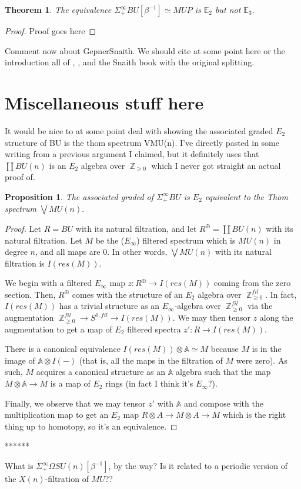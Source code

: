 \documentclass[reqno, oneside]{amsart}
\theoremstyle{definition}
\theoremstyle{plain}
\newtheorem{thm}[nul]{Theorem}
\newtheorem{prop}[nul]{Proposition}
\DeclareMathOperator{\Z}{\mathbb{Z}}
\begin{document}

\begin{thm}
The equivalence $\Sigma^{\infty}_+ BU [\beta^{-1}] \simeq MUP$ is $\mathbb{E}_2$ but not $\mathbb{E}_3$.
\end{thm}

\begin{proof}
Proof goes here
\end{proof}

Comment now about GepnerSnaith.
We should cite at some point here or the introduction all of \cite{SnaithNotMultiplicative},  \cite{GepnerSnaith}, and the Snaith book with the original splitting.

\section{Miscellaneous stuff here}

It would be nice to at some point deal with showing the associated graded $E_2$ structure of BU is the thom spectrum VMU(n).  I've directly pasted in some writing from a previous argument I claimed, but it definitely uses that $\coprod BU(n)$ is an $E_2$ algebra over $\Z _{\geq 0}$ which I never got straight an actual proof of.  

\begin{prop}The associated graded of $\Sigma^{\infty}_+BU$ is $E_2$ equivalent to the Thom spectrum $\bigvee MU(n).$
\end{prop}
\begin{proof}
Let $R = BU$ with its natural filtration, and let $R^{\oplus} = \coprod BU(n)$ with its natural filtration.  Let $M$ be the ($E_\infty$) filtered spectrum which is $MU(n)$ in degree $n$, and all maps are $0$.  In other words, $\bigvee MU(n)$ with its natural filtration is $I(res(M))$.  

We begin with a filtered $E_\infty$ map $z:R^\oplus \to I(res(M))$ coming from the zero section.  Then, $R^\oplus$ comes with the structure of an $E_2$ algebra over $\Z_{\geq 0}^{fil}$.  In fact, $I(res(M))$  has a trivial structure as an $E_\infty$-algebra over $\Z_{\geq 0}^{fil}$ via the augmentation $\Z_{\geq 0}^{fil}\to S^{0,fil} \to I(res(M))$.  We may then tensor $z$ along the augmentation to get a map of $E_2$ filtered spectra $z':R \to I(res(M))$.  

There is a canonical equivalence $I(res(M)) \otimes \mathbb{A} \simeq M$ because $M$ is in the image of $\mathbb{A} \otimes I(-)$ (that is, all the maps in the filtration of $M$ were zero).  As such, $M$ acquires a canonical structure as an $\mathbb{A}$ algebra such that the map $M \otimes \mathbb{A} \to M$ is a map of $E_2$ rings (in fact I think it's $E_\infty$?).  

Finally, we observe that we may tensor $z'$ with $\mathbb{A}$ and compose with the multiplication map to get an $E_2$ map $R\otimes A \to M \otimes A \to M$ which is the right thing up to homotopy, so it's an equivalence.  
\end{proof}

******  

What is $\Sigma^{\infty}_+ \Omega SU(n)[\beta^{-1}]$, by the way?  Is it related to a periodic version of the $X(n)$-filtration of $MU$??



\end{document}
